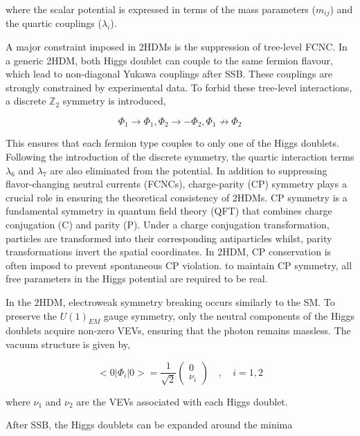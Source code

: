 where the scalar potential is expressed in terms of the mass parameters ($m_{ij}$) and the quartic couplings ($\lambda_i$). 

A major constraint imposed in 2HDMs is the suppression of tree-level \ac{FCNC}. In a generic 2HDM, both Higgs doublet can couple to the same fermion flavour, which lead to non-diagonal Yukawa couplings after SSB. These couplings are strongly constrained by experimental data. To forbid these tree-level interactions, a discrete $\mathbb{Z}_2$ symmetry \cite{2HDM(2)} is introduced, 

\begin{equation}
    \Phi_1 \to \Phi_1, \Phi_2 \to - \Phi_2, \Phi_1 \not\to \Phi_2 
\end{equation}

This ensures that each fermion type couples to only one of the Higgs doublets. Following the introduction of the discrete symmetry, the quartic interaction terms $\lambda_6$ and $\lambda_7$ are also eliminated from the potential. In addition to suppressing flavor-changing neutral currents (FCNCs), charge-parity (CP) symmetry plays a crucial role in ensuring the theoretical consistency of 2HDMs. CP symmetry is a fundamental symmetry in quantum field theory (QFT) that combines charge conjugation (C) and parity (P). Under a charge conjugation transformation, particles are transformed into their corresponding antiparticles whilst, parity transformations invert the spatial coordinates. In 2HDM, CP conservation is often imposd to prevent spontaneous CP violation. to maintain CP symmetry, all free parameters in the Higgs potential are required to be real.

In the 2HDM, electroweak symmetry breaking occurs similarly to the SM. To preserve the $U(1)_{EM}$ gauge symmetry, only the neutral components of the Higgs doublets acquire non-zero VEVs, ensuring that the photon remains massless. The vacuum structure is given by,

\begin{equation}
    <0|\Phi_i|0> = \frac{1}{\sqrt{2}} \begin{pmatrix}
        0 \\
        \nu_i
    \end{pmatrix} \quad,\quad i=1,2
\end{equation}

where $\nu_1$ and $\nu_2$ are the VEVs associated with each Higgs doublet.

After SSB, the Higgs doublets can be expanded around the minima

